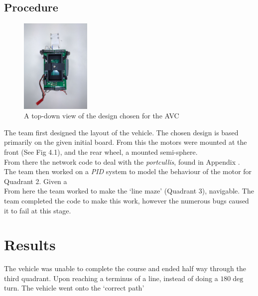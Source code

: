 \documentclass[paper=a4, fontsize=11pt]{scrartcl} %
\numberwithin{equation}{section} %
\numberwithin{figure}{section} %
\begin{document}
\subsection{Procedure}
\begin{figure}
  \begin{center}
    \includegraphics[width=0.3\textwidth]{top-down-view}
    \caption{A top-down view of the design chosen for the AVC}
  \end{center}
\end{figure}
The team first designed the layout of the vehicle. The chosen design is based
primarily on the given initial board. From this the motors were mounted at the
front (See Fig 4.1), and the rear wheel, a mounted semi-sphere.\\
From there the network code to deal with the \textit{portcullis}, found in
Appendix %
.\\
The team then worked on a \textit{PID} system to model the behaviour of the
motor for Quadrant 2. Given a \\
From here the team worked to make the `line maze' (Quadrant 3), navigable. The
team completed the code to make this work, however the numerous bugs caused it
to fail at this stage.
\section{Results}
The vehicle was unable to complete the course and ended half way through the
third quadrant. Upon reaching a terminus of a line, instead of doing a $180\deg$
turn. The vehicle went onto the `correct path'
\end{document}
